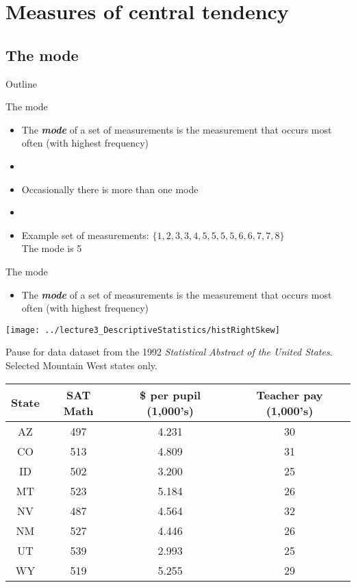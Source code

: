 \documentclass[xcolor=dvipsnames]{beamer}
\begin{document}
\section{Measures of central tendency}
\subsection{The mode}

\begin{frame}{Outline}
	\tableofcontents[currentsection,subsectionstyle=show/shaded/hide]
\end{frame}

\begin{frame}{The mode}
	\begin{itemize}
		\item The \emph{\textbf{mode}} of a set of measurements is the measurement that occurs most often (with highest frequency)
		\item[]
		\item Occasionally there is more than one mode 
		\item[]
		\item Example set of measurements: $\{1, 2, 3, 3, 4, 5, 5, 5, 5, 6, 6, 7, 7, 8\}$\\
		The mode is 5
	\end{itemize}
\end{frame}


\begin{frame}{The mode}
	\begin{itemize}
		\item The \emph{\textbf{mode}} of a set of measurements is the measurement that occurs most often (with highest frequency)
	\end{itemize}
	\begin{center}
			\texttt{[image: ../lecture3\_DescriptiveStatistics/histRightSkew]}
	\end{center}
\end{frame}

\begin{frame}{Pause for data}
dataset from the 1992 \emph{Statistical Abstract of the United States}. Selected Mountain West states only.
	\begin{center}
			\begin{tabular}{|c|c|c|c|}
			\hline 
			\textbf{State} & \textbf{SAT Math} & \textbf{\$ per pupil (1,000's)} & \textbf{Teacher pay (1,000's)} \\ 
			\hline \hline
			AZ & 497  & 4.231 & 30 \\ \hline 
			CO & 513  & 4.809 & 31 \\ \hline 
			ID & 502  & 3.200 & 25  \\  \hline 
			MT & 523  & 5.184 & 26 \\ \hline 
			NV & 487  & 4.564 & 32 \\ \hline 
			NM & 527  & 4.446 & 26 \\ \hline 
			UT & 539  & 2.993 & 25 \\ \hline 
			WY & 519  & 5.255 & 29 \\ \hline 
		\end{tabular} 
	\end{center}
\end{frame}
\end{document}

